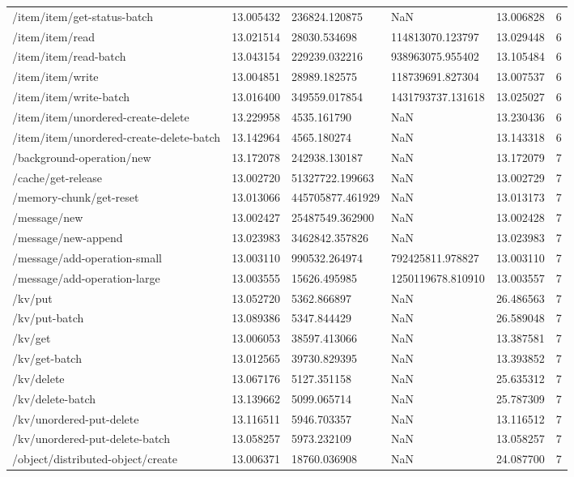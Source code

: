 \begin{tabularx}{\linewidth}{XXXXXX}
/item/item/get-status-batch & 13.005432 & 236824.120875 & NaN & 13.006828 & 6 \\
/item/item/read & 13.021514 & 28030.534698 & 114813070.123797 & 13.029448 & 6 \\
/item/item/read-batch & 13.043154 & 229239.032216 & 938963075.955402 & 13.105484 & 6 \\
/item/item/write & 13.004851 & 28989.182575 & 118739691.827304 & 13.007537 & 6 \\
/item/item/write-batch & 13.016400 & 349559.017854 & 1431793737.131618 & 13.025027 & 6 \\
/item/item/unordered-create-delete & 13.229958 & 4535.161790 & NaN & 13.230436 & 6 \\
/item/item/unordered-create-delete-batch & 13.142964 & 4565.180274 & NaN & 13.143318 & 6 \\
/background-operation/new & 13.172078 & 242938.130187 & NaN & 13.172079 & 7 \\
/cache/get-release & 13.002720 & 51327722.199663 & NaN & 13.002729 & 7 \\
/memory-chunk/get-reset & 13.013066 & 445705877.461929 & NaN & 13.013173 & 7 \\
/message/new & 13.002427 & 25487549.362900 & NaN & 13.002428 & 7 \\
/message/new-append & 13.023983 & 3462842.357826 & NaN & 13.023983 & 7 \\
/message/add-operation-small & 13.003110 & 990532.264974 & 792425811.978827 & 13.003110 & 7 \\
/message/add-operation-large & 13.003555 & 15626.495985 & 1250119678.810910 & 13.003557 & 7 \\
/kv/put & 13.052720 & 5362.866897 & NaN & 26.486563 & 7 \\
/kv/put-batch & 13.089386 & 5347.844429 & NaN & 26.589048 & 7 \\
/kv/get & 13.006053 & 38597.413066 & NaN & 13.387581 & 7 \\
/kv/get-batch & 13.012565 & 39730.829395 & NaN & 13.393852 & 7 \\
/kv/delete & 13.067176 & 5127.351158 & NaN & 25.635312 & 7 \\
/kv/delete-batch & 13.139662 & 5099.065714 & NaN & 25.787309 & 7 \\
/kv/unordered-put-delete & 13.116511 & 5946.703357 & NaN & 13.116512 & 7 \\
/kv/unordered-put-delete-batch & 13.058257 & 5973.232109 & NaN & 13.058257 & 7 \\
/object/distributed-object/create & 13.006371 & 18760.036908 & NaN & 24.087700 & 7 \\

\end{tabularx}
